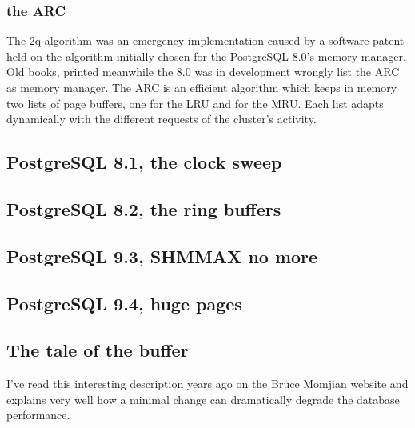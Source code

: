\subsubsection{the ARC}
The 2q algorithm was an emergency implementation caused by a software patent held on the algorithm initially 
chosen for the PostgreSQL 8.0's memory manager. Old books, printed meanwhile the 8.0 was in development 
wrongly list the ARC as memory manager. The ARC is an efficient algorithm which keeps in memory two 
lists of page buffers, one for the LRU and for the MRU. Each list adapts dynamically with the different requests 
of the cluster's activity. 

\subsection{PostgreSQL 8.1, the clock sweep}

\subsection{PostgreSQL 8.2, the ring buffers}

\subsection{PostgreSQL 9.3, SHMMAX no more}

\subsection{PostgreSQL 9.4, huge pages}

\subsection{The tale of the buffer}
I've read this interesting description years ago on the Bruce Momjian website and explains very well how a 
minimal change can dramatically degrade the database performance.\newline

